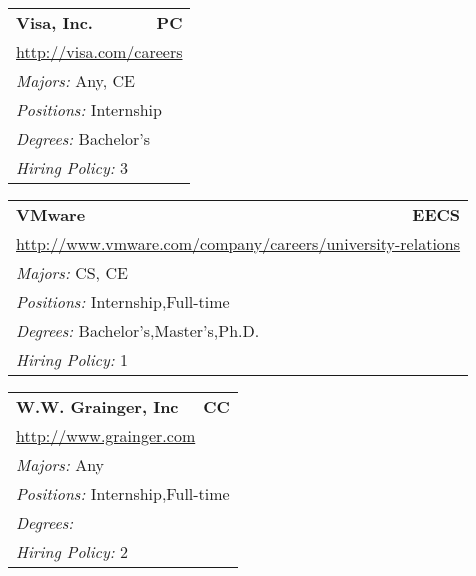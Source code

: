 \documentclass[twoside]{article}
\begin{document}
\begin{center}
\begin{multicols}{3}
\begin{FlushLeft}
\begin{minipage}{.9\columnwidth}
\end{minipage}
 
\begin{minipage}{.9\columnwidth}\begin{tabularx}{.95\columnwidth}{Xr}
                 {\Large\bf Visa, Inc.} & {\Large\bf PC}\\
    \multicolumn{2}{p{.95\columnwidth}}{\url{http://visa.com/careers}}\\
    \multicolumn{2}{p{.95\columnwidth}}{\emph{Majors:} Any, CE}\\
    \multicolumn{2}{p{.95\columnwidth}}{\emph{Positions:} Internship}\\
    \multicolumn{2}{p{.95\columnwidth}}{\emph{Degrees:} Bachelor's}\\
    \multicolumn{2}{p{.95\columnwidth}}{\emph{Hiring Policy:} 3}\\
    \end{tabularx}
    
\end{minipage}
 
\begin{minipage}{.9\columnwidth}\begin{tabularx}{.95\columnwidth}{Xr}
                 {\Large\bf VMware} & {\Large\bf EECS}\\
    \multicolumn{2}{p{.95\columnwidth}}{\url{http://www.vmware.com/company/careers/university-relations}}\\
    \multicolumn{2}{p{.95\columnwidth}}{\emph{Majors:} CS, CE}\\
    \multicolumn{2}{p{.95\columnwidth}}{\emph{Positions:} Internship,Full-time}\\
    \multicolumn{2}{p{.95\columnwidth}}{\emph{Degrees:} Bachelor's,Master's,Ph.D.}\\
    \multicolumn{2}{p{.95\columnwidth}}{\emph{Hiring Policy:} 1}\\
    \end{tabularx}
    
\end{minipage}
 
\begin{minipage}{.9\columnwidth}\begin{tabularx}{.95\columnwidth}{Xr}
                 {\Large\bf W.W. Grainger, Inc} & {\Large\bf CC}\\
    \multicolumn{2}{p{.95\columnwidth}}{\url{http://www.grainger.com}}\\
    \multicolumn{2}{p{.95\columnwidth}}{\emph{Majors:} Any}\\
    \multicolumn{2}{p{.95\columnwidth}}{\emph{Positions:} Internship,Full-time}\\
    \multicolumn{2}{p{.95\columnwidth}}{\emph{Degrees:} }\\
    \multicolumn{2}{p{.95\columnwidth}}{\emph{Hiring Policy:} 2}\\
    \end{tabularx}
    

\end{minipage}
\end{FlushLeft}
\end{multicols}
\end{center}
\end{document}

